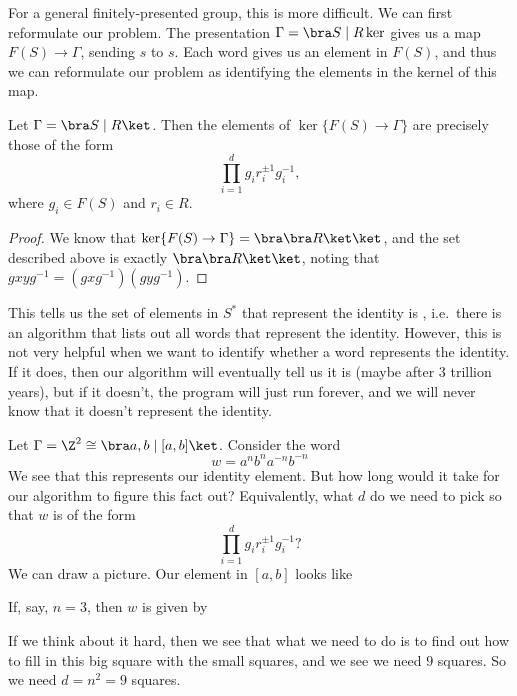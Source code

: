 \documentclass[a4paper]{article}
\begin{document}
For a general finitely-presented group, this is more difficult. We can first reformulate our problem. The presentation $\Gamma = \bra S \mid R \ker$ gives us a map $F(S) \to \Gamma$, sending $s$ to $s$. Each word gives us an element in $F(S)$, and thus we can reformulate our problem as identifying the elements in the kernel of this map.

\begin{lemma}
  Let $\Gamma = \bra S \mid R\ket$. Then the elements of $\ker \{F(S) \to \Gamma\}$ are precisely those of the form
  \[
    \prod_{i = 1}^d g_i r_i^{\pm 1} g_i^{-1},
  \]
  where $g_i \in F(S)$ and $r_i \in R$.
\end{lemma}

\begin{proof}
  We know that $\ker \{F(S) \to \Gamma\} = \bra \bra R\ket \ket$, and the set described above is exactly $\bra \bra R\ket \ket$, noting that $gxyg^{-1} = (gxg^{-1})(gyg^{-1})$.
\end{proof}

This tells us the set of elements in $S^*$ that represent the identity is , i.e.\ there is an algorithm that lists out all words that represent the identity. However, this is not very helpful when we want to identify whether a word represents the identity. If it does, then our algorithm will eventually tell us it is (maybe after 3 trillion years), but if it doesn't, the program will just run forever, and we will never know that it doesn't represent the identity.

\begin{eg}
  Let $\Gamma = \Z^2 \cong \bra a, b \mid [a, b]\ket$. Consider the word
  \[
    w = a^n b^n a^{-n} b^{-n}
  \]
  We see that this represents our identity element. But how long would it take for our algorithm to figure this fact out? Equivalently, what $d$ do we need to pick so that $w$ is of the form
  \[
    \prod_{i = 1}^d g_i r_i^{\pm 1} g_i^{-1}?
  \]
  We can draw a picture. Our element in $[a, b]$ looks like
  \begin{center}
  \end{center}
  If, say, $n = 3$, then $w$ is given by
  \begin{center}
  \end{center}
  If we think about it hard, then we see that what we need to do is to find out how to fill in this big square with the small squares, and we see we need $9$ squares. So we need $d = n^2 = 9$ squares.
\end{eg}
\end{document}
